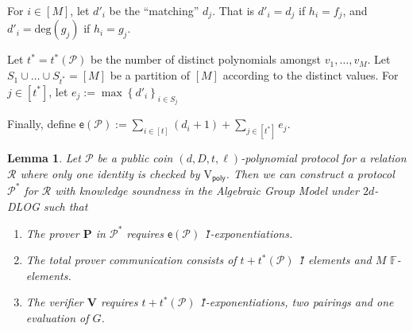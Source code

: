 \documentclass[11pt]{article} %
\newcommand{\F}{\ensuremath{\mathbb F}\xspace}
\newcommand{\proverexp}{\ensuremath{\mathsf{e}}\xspace}
\renewcommand{\deg}{\ensuremath{\mathrm{deg}}\xspace}
\newcommand{\polprot}[4]{$(#1,#2,#3,#4)$-polynomial protocol}
\newcommand{\defeq}{:=}
\newcommand{\sett}[2]{\ensuremath{\set{#1}_{#2}}\xspace}
\newcommand{\prv}{\ensuremath{\mathsf{\mathbf{P}}}\xspace}
\newcommand{\verpoly}{\ensuremath{\mathrm{V_{\mathsf{poly}}}}\xspace}
\newcommand{\ver}{\ensuremath{\mathsf{\mathbf{V}}}\xspace}
\newcommand{\rel}{\ensuremath{\mathcal{R}}\xspace}
\newcommand{\set}[1]{\ensuremath{\left\{#1\right\}}\xspace}
\newcommand{\prot}{\ensuremath{\mathscr{P}}\xspace}
\newcommand{\protprime}{\ensuremath{\mathscr{P^*}}\xspace}
\newcommand{\sumi}[1]{\sum_{i\in[#1]}}
\newcommand{\sumj}[1]{\sum_{j\in[#1]}}
\newtheorem{lemma}{Lemma}[section]
\begin{document}
For $i\in [M]$, let $d'_i$ be the ``matching'' $d_j$. That is $d'_i = d_j$ if $h_i=f_j$, and $d'_i = \deg(g_j)$ if $h_i=g_j$.




Let $t^* = t^*(\prot)$ be the number of distinct polynomials amongst $v_1,\ldots,v_M$.
Let $S_1\cup\ldots \cup S_{t^*}= [M]$ be a partition of $[M]$ according to the distinct values.
For $j\in [t^*]$, let $e_j\defeq \max \sett{d'_i}{i\in S_j}$

Finally, define $\proverexp(\prot) \defeq \sumi{t}(d_i+1) + \sumj{t^*} e_j$.

% 


 \begin{lemma}\label{lem:ideal-to-AGM}
 Let \prot be a public coin \polprot{d}{D}{t}{\ell} for a relation \rel where only one identity is checked by \verpoly.
 Then we can construct a protocol \protprime for \rel with knowledge soundness in the Algebraic Group Model under $2d$-DLOG such that
 \begin{enumerate}
  \item The prover \prv in \protprime requires $\proverexp(\prot)$ \G1-exponentiations.
  \item The total prover communication consists of $t+t^*(\prot)$ \G1 elements and $M$ \F-elements. 
\item The verifier \ver requires $t+t^*(\prot)$ \G1-exponentiations, two pairings and one evaluation of $G$.
  \end{enumerate}

\end{lemma}
\end{document}
